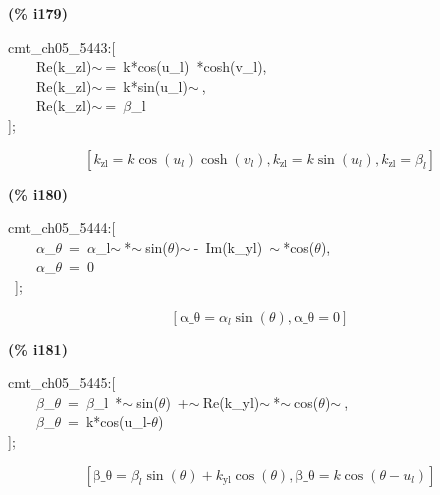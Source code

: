\documentclass[fleqn]{article}
\begin{document}
\noindent
\begin{minipage}[t]{4.000000em}\color{red}\bfseries
(\% i179)	
\end{minipage}
\begin{minipage}[t]{\textwidth}\color{blue}
cmt\_ch05\_5443:[\\
\ \ \ \ Re(k\_zl)\ensuremath{\sim\ }=\ k*cos(u\_l)\ *cosh(v\_l),\\
\ \ \ \ Re(k\_zl)\ensuremath{\sim\ }=\ k*sin(u\_l)\ensuremath{\sim\ },\\
\ \ \ \ Re(k\_zl)\ensuremath{\sim\ }=\ \ensuremath{\beta}\_l\\
];
\end{minipage}
\[\displaystyle \tag{\% o179} 
\left[ {k_{\ensuremath{\mathrm{zl}}}}=k \cos{\left( {u_l}\right) } \cosh{\left( {v_l}\right) }\operatorname{,}{k_{\ensuremath{\mathrm{zl}}}}=k \sin{\left( {u_l}\right) }\operatorname{,}{k_{\ensuremath{\mathrm{zl}}}}={{\beta }_l}\right] \mbox{}
\]


\noindent
\begin{minipage}[t]{4.000000em}\color{red}\bfseries
(\% i180)	
\end{minipage}
\begin{minipage}[t]{\textwidth}\color{blue}
cmt\_ch05\_5444:[\\
\ \ \ \ \ensuremath{\alpha}\_\ensuremath{\theta}\ =\ \ensuremath{\alpha}\_l\ensuremath{\sim\ }*\ensuremath{\sim\ }sin(\ensuremath{\theta})\ensuremath{\sim\ }-\ Im(k\_yl)\ \ensuremath{\sim\ }*cos(\ensuremath{\theta}),\\
\ \ \ \ \ensuremath{\alpha}\_\ensuremath{\theta}\ =\ 0\\
\ ];
\end{minipage}
\[\displaystyle \tag{\% o180} 
\left[ \ensuremath{\mathrm{\alpha \_ \theta }}={{\alpha }_l} \sin{\left( \theta \right) }\operatorname{,}\ensuremath{\mathrm{\alpha \_ \theta }}=0\right] \mbox{}
\]


\noindent
\begin{minipage}[t]{4.000000em}\color{red}\bfseries
(\% i181)	
\end{minipage}
\begin{minipage}[t]{\textwidth}\color{blue}
cmt\_ch05\_5445:[\\
\ \ \ \ \ensuremath{\beta}\_\ensuremath{\theta}\ =\ \ensuremath{\beta}\_l\ *\ensuremath{\sim\ }sin(\ensuremath{\theta})\ +\ensuremath{\sim\ }Re(k\_yl)\ensuremath{\sim\ }*\ensuremath{\sim\ }cos(\ensuremath{\theta})\ensuremath{\sim\ },\\
\ \ \ \ \ensuremath{\beta}\_\ensuremath{\theta}\ =\ k*cos(u\_l-\ensuremath{\theta})\\
];
\end{minipage}
\[\displaystyle \tag{\% o181} 
\left[ \ensuremath{\mathrm{\beta \_ \theta }}={{\beta }_l} \sin{\left( \theta \right) }+{k_{\ensuremath{\mathrm{yl}}}} \cos{\left( \theta \right) }\operatorname{,}\ensuremath{\mathrm{\beta \_ \theta }}=k \cos{\left( \theta -{u_l}\right) }\right] \mbox{}
\]
\end{document}
